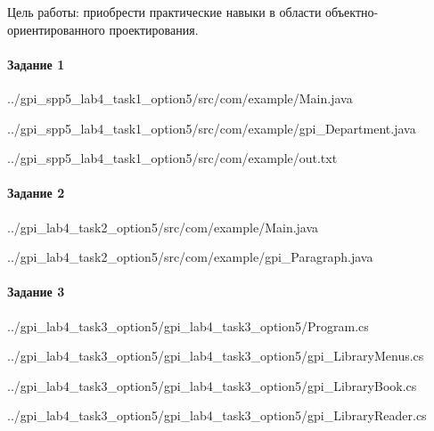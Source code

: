 Цель работы:
приобрести практические навыки в области объектно-ориентированного проектирования.


\paragraph{Задание 1} \hspace{0pt}


{../gpi_spp5_lab4_task1_option5/src/com/example/Main.java}


{../gpi_spp5_lab4_task1_option5/src/com/example/gpi_Department.java}


{../gpi_spp5_lab4_task1_option5/src/com/example/out.txt}



\paragraph{Задание 2} \hspace{0pt}


{../gpi_lab4_task2_option5/src/com/example/Main.java}


{../gpi_lab4_task2_option5/src/com/example/gpi_Paragraph.java}



\paragraph{Задание 3} \hspace{0pt}


{../gpi_lab4_task3_option5/gpi_lab4_task3_option5/Program.cs}


{../gpi_lab4_task3_option5/gpi_lab4_task3_option5/gpi_LibraryMenus.cs}


{../gpi_lab4_task3_option5/gpi_lab4_task3_option5/gpi_LibraryBook.cs}


{../gpi_lab4_task3_option5/gpi_lab4_task3_option5/gpi_LibraryReader.cs}

\newpage
